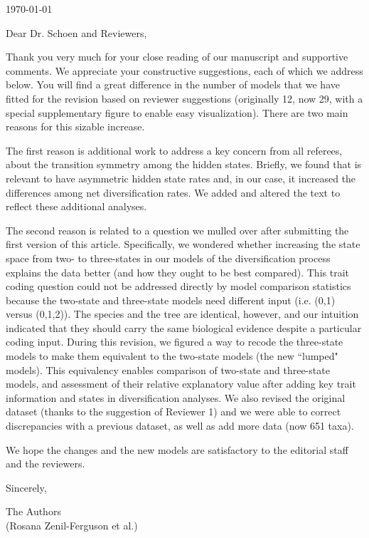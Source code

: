 \documentclass[11pt]{article}
\begin{document}
\hfill \today

Dear Dr. Schoen and Reviewers,

\medskip
Thank you very much for your close reading of our manuscript and supportive comments. We appreciate your constructive suggestions, each of which we address below. You will find a great difference in the number of models that we have fitted for the revision based on reviewer suggestions (originally 12, now 29, with a special supplementary figure to enable easy visualization). There are two main reasons for this sizable increase. 

The first reason is additional work to address a key concern from all referees, about the transition symmetry among the hidden states. 
Briefly, we found that is relevant to have asymmetric hidden state rates and, in our case, it increased the differences among net diversification rates. 
We added and altered the text to reflect these additional analyses. 


The second reason is related to a question we mulled over after submitting the first version of this article. Specifically, we wondered whether increasing the state space from two- to three-states in our models of the diversification process explains the data better (and how they ought to be best compared). 
This  trait coding question could not be addressed directly by model comparison statistics because the two-state and three-state models need different input (i.e. (0,1) versus (0,1,2)). 
The species and the tree are identical, however, and our intuition indicated that they should carry the same biological evidence despite a particular coding input. 
During this revision, we figured a way to recode the three-state models to make them equivalent to the two-state models (the new ``lumped" models). 
This equivalency enables comparison of two-state and three-state models, and assessment of their relative explanatory value after adding key trait information and states in diversification analyses. 
We also revised the original dataset (thanks to the suggestion of Reviewer 1) and we were able to correct discrepancies with a previous dataset, as well as add more data (now 651 taxa).

We hope the changes and the new models are satisfactory to the editorial staff and the reviewers.

\medskip
Sincerely,

The Authors \\
(Rosana Zenil-Ferguson et al.)


\end{document}
